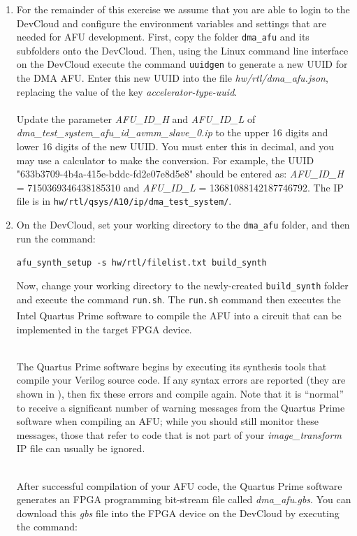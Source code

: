 \documentclass[epsfig,10pt,fullpage]{article}
\begin{document}
\begin{enumerate}
\item
For the remainder of this exercise we assume that you are able to login to the DevCloud and configure the environment variables and settings that are needed for AFU development.  First, copy the folder \texttt{dma\_afu} and its subfolders onto the DevCloud.  Then, 
using the Linux command line interface on the DevCloud execute the command 
\texttt{uuidgen} to generate a new UUID for the DMA AFU.
Enter this new UUID into the file {\it hw/rtl/dma\_afu.json}, replacing the value of the key \emph{accelerator-type-uuid}.\\
\\
Update the parameter \emph{AFU\_ID\_H}  and \emph{AFU\_ID\_L} of \emph{dma\_test\_system\_afu\_id\_avmm\_slave\_0.ip} to the upper 16 digits and lower 16 digits of the new UUID. You must enter this in decimal, and you may use a calculator to make the conversion. For example, the UUID "633b3709-4b4a-415e-bddc-fd2e07e8d5e8" should be entered as: \emph{AFU\_ID\_H} = 7150369346438185310 and \emph{AFU\_ID\_L} = 13681088142187746792. The IP file is in \texttt{hw/rtl/qsys/A10/ip/dma\_test\_system/}.

\item
On the DevCloud, set your working directory to the \texttt{dma\_afu} folder, and then 
run the command: 

\noindent
\texttt{afu\_synth\_setup -s hw/rtl/filelist.txt build\_synth}

Now, change your working directory to the newly-created \texttt{build\_synth} folder and 
execute the command \texttt{run.sh}. 
The \texttt{run.sh} command then executes the Intel 
Quartus\textsuperscript{\textregistered} Prime software to compile the AFU into a circuit
that can be implemented in the target FPGA device.

~\\
\noindent
The Quartus Prime software begins by executing its synthesis tools that
compile your Verilog source code. If any syntax errors are reported (they are shown in 
), then fix these errors and compile again. Note that it is 
``normal'' to receive a significant number of warning messages from the Quartus Prime 
software when compiling an AFU; while you should still monitor these messages, those that
refer to code that is not part of your \emph{image\_transform} IP file can usually be ignored.

~\\
\noindent
After successful compilation of your AFU code, the Quartus Prime software generates an FPGA 
programming bit-stream file called {\it dma\_afu.gbs}. You can download this {\it gbs} file into the FPGA device on the DevCloud by executing the command:


\end{enumerate}
\end{document}
